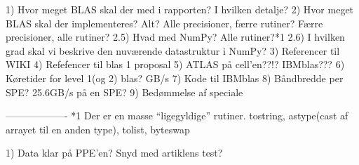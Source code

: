 
1)   Hvor meget BLAS skal der med i rapporten? I hvilken detalje?
2)   Hvor meget BLAS skal der implementeres? Alt? Alle precisioner, færre rutiner? Færre precisioner, alle rutiner?
2.5) Hvad med NumPy? Alle rutiner?*1
2.6) I hvilken grad skal vi beskrive den nuværende datastruktur i NumPy?
3)   Referencer til WIKI
4)   Refefencer til blas 1 proposal 
5)   ATLAS på cell'en??!? IBMblas???
6)   Køretider for level 1(og 2) blas? GB/s
7)   Kode til IBMblas
8)   Båndbredde per SPE? 25.6GB/s på en SPE?
9)   Bedømmelse af speciale



-------------------
*1 Der er en masse ``ligegyldige'' rutiner. tostring, astype(cast af arrayet til en anden type), tolist, byteswap


1)  Data klar på PPE'en? Snyd med artiklens test?
